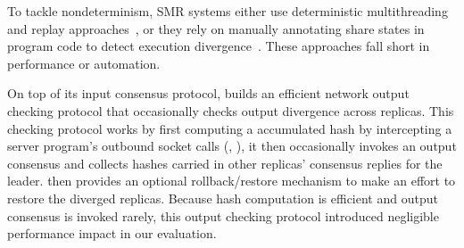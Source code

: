 To tackle nondeterminism, SMR systems either use deterministic multithreading 
and replay approaches~\cite{rex:eurosys14,crane:sosp15,ddos:asplos13}, or they 
rely on manually annotating share states in program code to detect execution 
divergence~\cite{eve:osdi12}. These approaches fall short in performance 
or automation.

On top of its input consensus protocol, \xxx builds an efficient network output 
checking protocol that occasionally checks output divergence across replicas. 
This checking protocol works by first computing a accumulated hash by 
intercepting a server program's outbound socket calls (\eg, \send), it then 
occasionally invokes an output consensus and collects hashes carried in other 
replicas' consensus replies for the leader. \xxx then provides an optional 
rollback/restore mechanism to make an effort to restore the diverged replicas. 
Because hash computation is efficient and output consensus is invoked rarely, 
this output checking protocol introduced negligible performance impact in our 
evaluation.


% 



